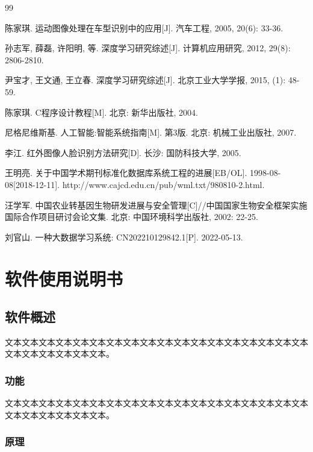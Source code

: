 \documentclass{suse-cs-thesis}
\begin{document}
\begin{thebibliography}{99}

 陈家琪. 运动图像处理在车型识别中的应用[J]. 汽车工程, 2005, 20(6): 33-36.

 孙志军, 薛磊, 许阳明, 等. 深度学习研究综述[J]. 计算机应用研究, 2012, 29(8): 2806-2810.

 尹宝才, 王文通, 王立春. 深度学习研究综述[J]. 北京工业大学学报, 2015, (1): 48-59.

 陈家琪. C程序设计教程[M]. 北京: 新华出版社, 2004.

 尼格尼维斯基. 人工智能:智能系统指南[M]. 第3版. 北京: 机械工业出版社, 2007.

 李江. 红外图像人脸识别方法研究[D]. 长沙: 国防科技大学, 2005.

 王明亮. 关于中国学术期刊标准化数据库系统工程的进展[EB/OL]. 1998-08-08[2018-12-11]. http://www.cajcd.edu.cn/pub/wml.txt/980810-2.html.

 汪学军. 中国农业转基因生物研发进展与安全管理[C]//中国国家生物安全框架实施国际合作项目研讨会论文集. 北京: 中国环境科学出版社, 2002: 22-25.

 刘官山. 一种大数据学习系统: CN202210129842.1[P]. 2022-05-13.

\end{thebibliography}

\appendix
\chapter{软件使用说明书}

\section{软件概述}

文本文本文本文本文本文本文本文本文本文本文本文本文本文本文本文本文本文本文本文本文本文本文本文本。

\subsection{功能}

文本文本文本文本文本文本文本文本文本文本文本文本文本文本文本文本文本文本文本文本文本文本文本文本。

\subsection{原理}
\end{document}
